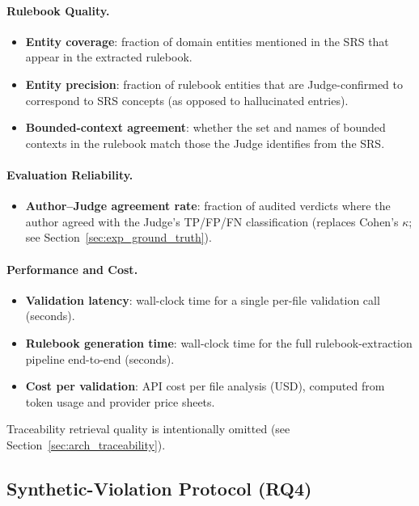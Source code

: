 \documentclass[smallextended]{svjour3}
\begin{document}
\paragraph{Rulebook Quality.}
\begin{itemize}
    \item \textbf{Entity coverage}: fraction of domain entities mentioned in the SRS that appear in the extracted rulebook.
    \item \textbf{Entity precision}: fraction of rulebook entities that are Judge-confirmed to correspond to SRS concepts (as opposed to hallucinated entries).
    \item \textbf{Bounded-context agreement}: whether the set and names of bounded contexts in the rulebook match those the Judge identifies from the SRS.
\end{itemize}

\paragraph{Evaluation Reliability.}
\begin{itemize}
    \item \textbf{Author--Judge agreement rate}: fraction of audited verdicts where the author agreed with the Judge's TP/FP/FN classification (replaces Cohen's $\kappa$; see Section~\ref{sec:exp_ground_truth}).
\end{itemize}

\paragraph{Performance and Cost.}
\begin{itemize}
    \item \textbf{Validation latency}: wall-clock time for a single per-file validation call (seconds).
    \item \textbf{Rulebook generation time}: wall-clock time for the full rulebook-extraction pipeline end-to-end (seconds).
    \item \textbf{Cost per validation}: API cost per file analysis (USD), computed from token usage and provider price sheets.
\end{itemize}

Traceability retrieval quality is intentionally omitted (see Section~\ref{sec:arch_traceability}).

\subsection{Synthetic-Violation Protocol (RQ4)}
\label{sec:exp_synthetic}
\end{document}

